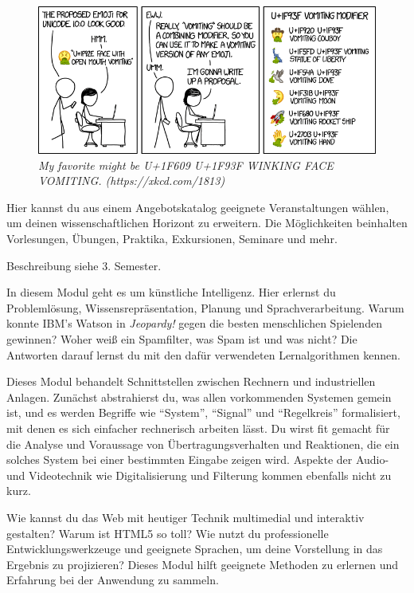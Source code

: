 \begin{figure}[b!]
\centering
\includegraphics[scale=.4]{img/xkcd/vomiting_emoji.png}
\caption*{{\small \textit{My favorite might be U+1F609 U+1F93F WINKING FACE VOMITING\@. (https://xkcd.com/1813)}}}
\end{figure}


Hier kannst du aus einem Angebotskatalog geeignete Veranstaltungen wählen, um deinen wissenschaftlichen Horizont zu erweitern.
Die Möglichkeiten beinhalten Vorlesungen, Übungen, Praktika, Exkursionen, Seminare und mehr.

Beschreibung siehe 3. Semester.

In diesem Modul geht es um künstliche Intelligenz.
Hier erlernst du Problemlösung, Wissensrepräsentation, Planung und Sprachverarbeitung.
Warum konnte IBM's Watson in \textit{Jeopardy!} gegen die besten menschlichen Spielenden gewinnen?
Woher weiß ein Spamfilter, was Spam ist und was nicht?
Die Antworten darauf lernst du mit den dafür verwendeten Lernalgorithmen kennen.

Dieses Modul behandelt Schnittstellen zwischen Rechnern und industriellen Anlagen.
Zunächst abstrahierst du, was allen vorkommenden Systemen gemein ist, und es werden Begriffe wie \enquote{System}, \enquote{Signal} und \enquote{Regelkreis} formalisiert, mit denen es sich einfacher rechnerisch arbeiten lässt.
Du wirst fit gemacht für die Analyse und Voraussage von Übertragungsverhalten und Reaktionen, die ein solches System bei einer bestimmten Eingabe zeigen wird.
Aspekte der Audio- und Videotechnik wie Digitalisierung und Filterung kommen ebenfalls nicht zu kurz.

Wie kannst du das Web mit heutiger Technik multimedial und interaktiv gestalten? Warum ist HTML5 so toll?
Wie nutzt du professionelle Entwicklungswerkzeuge und geeignete Sprachen, um deine Vorstellung in das Ergebnis zu projizieren?
Dieses Modul hilft geeignete Methoden zu erlernen und Erfahrung bei der Anwendung zu sammeln.

